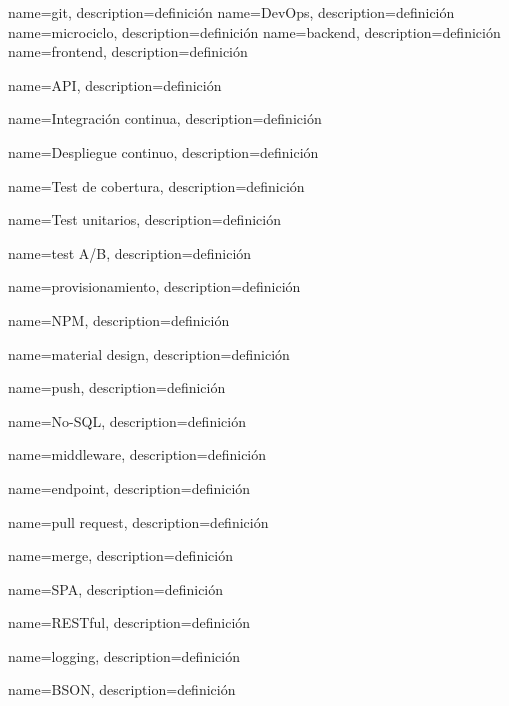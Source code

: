 {
name={git},
description={definición}
}
{
name={DevOps},
description={definición}
}
{
name={microciclo},
description={definición}
}
{
name={backend},
description={definición}
}
{
name={frontend},
description={definición}
}

{
name={API},
description={definición}
}

{
name={Integración continua},
description={definición}
}

{
name={Despliegue continuo},
description={definición}
}

{
name={Test de cobertura},
description={definición}
}

{
name={Test unitarios},
description={definición}
}

{
name={test A/B},
description={definición}
}

{
name={provisionamiento},
description={definición}
}

{
name={NPM},
description={definición}
}

{
name={material design},
description={definición}
}

{
name={push},
description={definición}
}

{
name={No-SQL},
description={definición}
}

{
name={middleware},
description={definición}
}

{
name={endpoint},
description={definición}
}

{
name={pull request},
description={definición}
}

{
name={merge},
description={definición}
}

{
name={SPA},
description={definición}
}

{
name={RESTful},
description={definición}
}

{
name={logging},
description={definición}
}

{
name={BSON},
description={definición}
}

